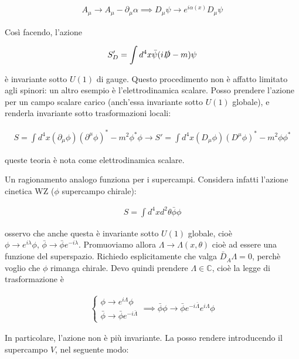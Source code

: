 \documentclass{report}
\begin{document}
\begin{align}
    A_\mu \to A_\mu - \partial_\mu \alpha \implies D_\mu \psi \to e^{i\alpha(x)}D_\mu \psi 
\end{align}

Così facendo, l'azione 

\begin{align}
    S'_D = \int d^4x \bar{\psi}(i\slashed{D}-m)\psi
\end{align}

è invariante sotto \(U(1)\) di gauge. Questo procedimento non è affatto limitato agli spinori: un altro esempio è l'elettrodinamica scalare. Posso prendere l'azione per un campo scalare carico (anch'essa invariante sotto \(U(1)\) globale), e renderla invariante sotto trasformazioni locali: 

\begin{align}
    S = \int d^4x (\partial_\mu \phi)(\partial^\mu \phi)^* -m^2 \phi^*\phi \to S' = \int d^4x (D_\mu \phi)(D^\mu \phi)^* - m^2\phi\phi^*
\end{align}

queste teoria è nota come elettrodinamica scalare. 

Un ragionamento analogo funziona per i supercampi. Considera infatti l'azione cinetica WZ (\(\phi\) supercampo chirale):

\begin{align}
    S = \int d^4x d^2\theta \bar{\phi}\phi
\end{align}

osservo che anche questa è invariante sotto \(U(1)\) globale, cioè \(\phi \to e^{i\lambda}\phi, \, \bar{\phi} \to \bar{\phi}e^{-i\lambda}\). Promuoviamo allora \(\Lambda \to \Lambda(x, \theta)\) cioè ad essere una funzione del superspazio. Richiedo esplicitamente che valga \(\bar{D}_{\dot{A}}\Lambda = 0\), perchè voglio che \(\phi\) rimanga chirale. Devo quindi prendere \(\Lambda \in \mathbb{C}\), cioè la legge di trasformazione è 

\begin{align}
    \begin{cases}
        \phi \to e^{i\Lambda}\phi \\ \bar{\phi} \to \bar{\phi}e^{-i\bar{\Lambda}}
    \end{cases} \implies \bar{\phi}\phi \to \bar{\phi}e^{-i\bar{\Lambda}}e^{i\Lambda}\phi
\end{align}

In particolare, l'azione non è più invariante. La posso rendere introducendo il supercampo \(V\), nel seguente modo: 
\end{document}
